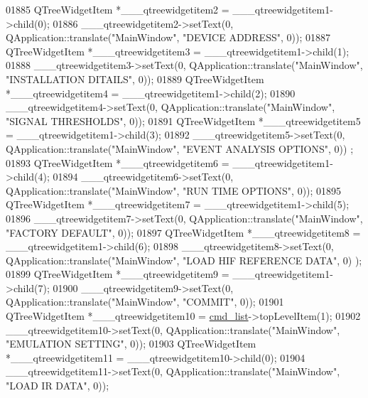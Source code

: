 \begin{DoxyCode}
01885         QTreeWidgetItem *\_\_\_qtreewidgetitem2 = \_\_\_qtreewidgetitem1->child(0);
01886         \_\_\_qtreewidgetitem2->setText(0, QApplication::translate(\textcolor{stringliteral}{"MainWindow"}, \textcolor{stringliteral}{"DEVICE ADDRESS"}, 0));
01887         QTreeWidgetItem *\_\_\_qtreewidgetitem3 = \_\_\_qtreewidgetitem1->child(1);
01888         \_\_\_qtreewidgetitem3->setText(0, QApplication::translate(\textcolor{stringliteral}{"MainWindow"}, \textcolor{stringliteral}{"INSTALLATION DITAILS"}, 0));
01889         QTreeWidgetItem *\_\_\_qtreewidgetitem4 = \_\_\_qtreewidgetitem1->child(2);
01890         \_\_\_qtreewidgetitem4->setText(0, QApplication::translate(\textcolor{stringliteral}{"MainWindow"}, \textcolor{stringliteral}{"SIGNAL THRESHOLDS"}, 0));
01891         QTreeWidgetItem *\_\_\_qtreewidgetitem5 = \_\_\_qtreewidgetitem1->child(3);
01892         \_\_\_qtreewidgetitem5->setText(0, QApplication::translate(\textcolor{stringliteral}{"MainWindow"}, \textcolor{stringliteral}{"EVENT ANALYSIS OPTIONS"}, 0))
      ;
01893         QTreeWidgetItem *\_\_\_qtreewidgetitem6 = \_\_\_qtreewidgetitem1->child(4);
01894         \_\_\_qtreewidgetitem6->setText(0, QApplication::translate(\textcolor{stringliteral}{"MainWindow"}, \textcolor{stringliteral}{"RUN TIME OPTIONS"}, 0));
01895         QTreeWidgetItem *\_\_\_qtreewidgetitem7 = \_\_\_qtreewidgetitem1->child(5);
01896         \_\_\_qtreewidgetitem7->setText(0, QApplication::translate(\textcolor{stringliteral}{"MainWindow"}, \textcolor{stringliteral}{"FACTORY DEFAULT"}, 0));
01897         QTreeWidgetItem *\_\_\_qtreewidgetitem8 = \_\_\_qtreewidgetitem1->child(6);
01898         \_\_\_qtreewidgetitem8->setText(0, QApplication::translate(\textcolor{stringliteral}{"MainWindow"}, \textcolor{stringliteral}{"LOAD HIF REFERENCE DATA"}, 0)
      );
01899         QTreeWidgetItem *\_\_\_qtreewidgetitem9 = \_\_\_qtreewidgetitem1->child(7);
01900         \_\_\_qtreewidgetitem9->setText(0, QApplication::translate(\textcolor{stringliteral}{"MainWindow"}, \textcolor{stringliteral}{"COMMIT"}, 0));
01901         QTreeWidgetItem *\_\_\_qtreewidgetitem10 = \hyperlink{a00080_aa66ece71395b435e915d384fb63bac1d}{cmd\_list}->topLevelItem(1);
01902         \_\_\_qtreewidgetitem10->setText(0, QApplication::translate(\textcolor{stringliteral}{"MainWindow"}, \textcolor{stringliteral}{"EMULATION SETTING"}, 0));
01903         QTreeWidgetItem *\_\_\_qtreewidgetitem11 = \_\_\_qtreewidgetitem10->child(0);
01904         \_\_\_qtreewidgetitem11->setText(0, QApplication::translate(\textcolor{stringliteral}{"MainWindow"}, \textcolor{stringliteral}{"LOAD IR DATA"}, 0));

\end{DoxyCode}

